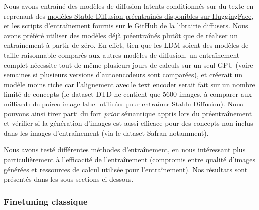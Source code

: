 \documentclass{article}
\begin{document}
Nous avons entraîné des modèles de diffusion latents conditionnés sur du texte en reprenant des \href{https://huggingface.co/stabilityai/stable-diffusion-2-1-base}{modèles Stable Diffusion préentraînés disponibles sur HuggingFace}, et les scripts d'entraînement fournis \href{https://github.com/huggingface/diffusers/tree/main/examples}{sur le GitHub de la librairie diffusers}. Nous avons préféré utiliser des modèles déjà préentraînés plutôt que de réaliser un entraînement à partir de zéro. En effet, bien que les LDM soient des modèles de taille raisonnable comparés aux autres modèles de diffusion, un entraînement complet nécessite tout de même plusieurs jours de calculs sur un seul GPU (voire semaines si plusieurs versions d'autoencodeurs sont comparées), et créerait un modèle moins riche car l'alignement avec le text encoder serait fait sur un nombre limité de concepts (le dataset DTD ne contient que 5600 images, à comparer aux milliards de paires image-label utilisées pour entraîner Stable Diffusion). Nous pouvons ainsi tirer parti du fort \textit{prior} sémantique appris lors du préentraînement et vérifier si la génération d'images est aussi efficace pour des concepts non inclus dans les images d'entraînement (via le dataset Safran notamment). \par
Nous avons testé différentes méthodes d'entraînement, en nous intéressant plus particulièrement à l'efficacité de l'entraînement (compromis entre qualité d'images générées et ressources de calcul utilisée pour l'entraînement). Nos résultats sont présentés dans les sous-sections ci-dessous.

\subsubsection{Finetuning classique}
\label{sec:Finetuning_classique}
\end{document}
